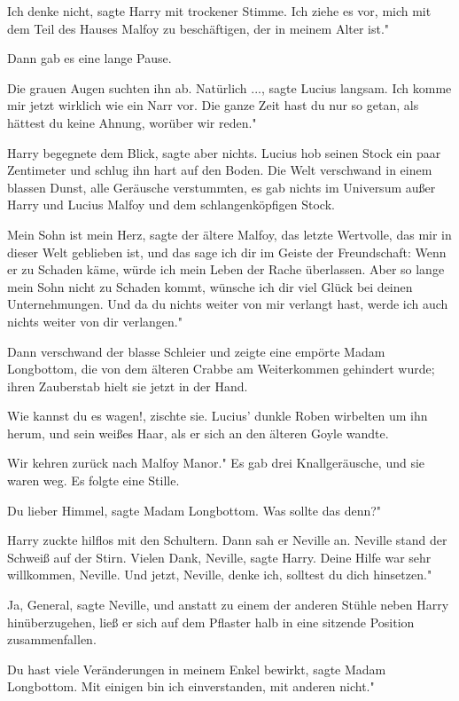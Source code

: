 \glqq Ich denke nicht\grqq{}, sagte Harry mit trockener Stimme. \glqq Ich ziehe
es vor, mich mit dem Teil des Hauses Malfoy zu beschäftigen, der in meinem Alter
ist."

Dann gab es eine lange Pause.

Die grauen Augen suchten ihn ab. \glqq Natürlich ...\grqq{}, sagte Lucius
langsam. \glqq Ich komme mir jetzt wirklich wie ein Narr vor. Die ganze Zeit
hast du nur so getan, als hättest du keine Ahnung, worüber wir reden."

Harry begegnete dem Blick, sagte aber nichts. Lucius hob seinen Stock ein paar
Zentimeter und schlug ihn hart auf den Boden. Die Welt verschwand in einem
blassen Dunst, alle Geräusche verstummten, es gab nichts im Universum außer
Harry und Lucius Malfoy und dem schlangenköpfigen Stock.

\glqq Mein Sohn ist mein Herz\grqq{}, sagte der ältere Malfoy, \glqq das letzte
Wertvolle, das mir in dieser Welt geblieben ist, und das sage ich dir im Geiste
der Freundschaft: Wenn er zu Schaden käme, würde ich mein Leben der Rache
überlassen. Aber so lange mein Sohn nicht zu Schaden kommt, wünsche ich dir viel
Glück bei deinen Unternehmungen. Und da du nichts weiter von mir verlangt hast,
werde ich auch nichts weiter von dir verlangen."

Dann verschwand der blasse Schleier und zeigte eine empörte Madam Longbottom,
die von dem älteren Crabbe am Weiterkommen gehindert wurde; ihren Zauberstab
hielt sie jetzt in der Hand.

\glqq Wie kannst du es wagen!\grqq{}, zischte sie. Lucius' dunkle Roben
wirbelten um ihn herum, und sein weißes Haar, als er sich an den älteren Goyle
wandte.

\glqq Wir kehren zurück nach Malfoy Manor." Es gab drei Knallgeräusche, und sie
waren weg. Es folgte eine Stille.

\glqq Du lieber Himmel\grqq{}, sagte Madam Longbottom. \glqq Was sollte das
denn?"

Harry zuckte hilflos mit den Schultern. Dann sah er Neville an. Neville stand
der Schweiß auf der Stirn. \glqq Vielen Dank, Neville\grqq{}, sagte Harry. \glqq
Deine Hilfe war sehr willkommen, Neville. Und jetzt, Neville, denke ich,
solltest du dich hinsetzen."

\glqq Ja, General\grqq{}, sagte Neville, und anstatt zu einem der anderen Stühle
neben Harry hinüberzugehen, ließ er sich auf dem Pflaster halb in eine sitzende
Position zusammenfallen.

\glqq Du hast viele Veränderungen in meinem Enkel bewirkt\grqq{}, sagte Madam
Longbottom. \glqq Mit einigen bin ich einverstanden, mit anderen nicht."

